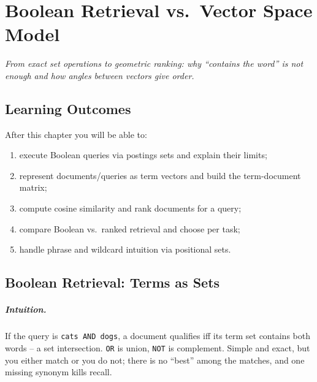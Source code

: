 \chapter{Boolean Retrieval vs.\ Vector Space Model}\label{ch:boolean-vector}
\begin{center}\small\textit{From exact set operations to geometric ranking: why ``contains the word'' is not enough and how angles between vectors give order.}\end{center}

\noindent{}
\vspace{0.4em}

\section*{Learning Outcomes}
After this chapter you will be able to:
\begin{enumerate}[label=(L\arabic*)]
  \item execute Boolean queries via postings sets and explain their limits;
  \item represent documents/queries as term vectors and build the term-document matrix;
  \item compute cosine similarity and rank documents for a query;
  \item compare Boolean vs.\ ranked retrieval and choose per task;
  \item handle phrase and wildcard intuition via positional sets.
\end{enumerate}

\section{Boolean Retrieval: Terms as Sets}\label{sec:boolean}
\paragraph{Intuition.} If the query is \texttt{cats AND dogs}, a document qualifies iff its term set contains both words -- a set intersection. \texttt{OR} is union, \texttt{NOT} is complement. Simple and exact, but you either match or you do not; there is no ``best'' among the matches, and one missing synonym kills recall.

